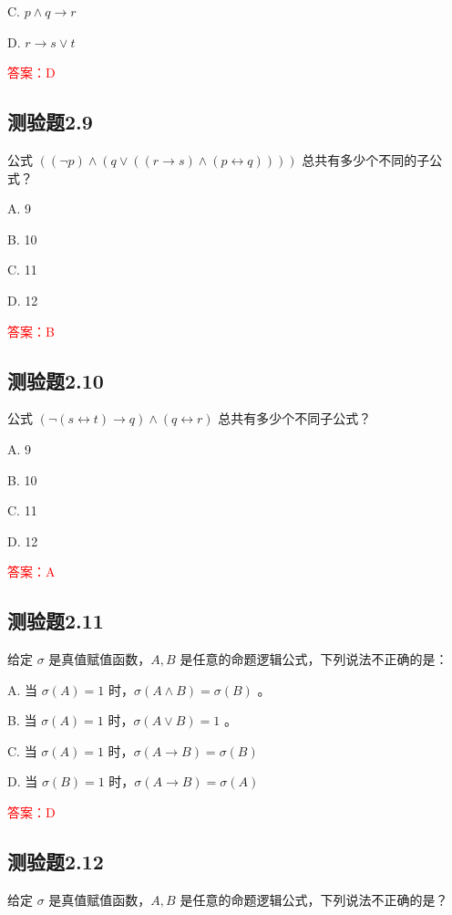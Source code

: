 \documentclass[UTF8, heading=true]{ctexart}
\begin{document}
C. $p \wedge q \rightarrow r$

D. $r \rightarrow s \vee t$

\textcolor{red}{答案：D}


\subsection{测验题2.9}

公式 $((\neg p) \wedge(q \vee((r \rightarrow s) \wedge(p \leftrightarrow q))))$ 总共有多少个不同的子公式？

A. 9

B. 10

C. 11

D. 12

\textcolor{red}{答案：B}

\subsection{测验题2.10}

公式 $(\neg(s \leftrightarrow t) \rightarrow q) \wedge(q \leftrightarrow r)$ 总共有多少个不同子公式？

A. 9

B. 10

C. 11

D. 12

\textcolor{red}{答案：A}

\subsection{测验题2.11}

给定 $\sigma$ 是真值赋值函数，$A, B$ 是任意的命题逻辑公式，下列说法不正确的是：

A. 当 $\sigma(A)=1$ 时，$\sigma(A \wedge B)=\sigma(B)$ 。

B. 当 $\sigma(A)=1$ 时，$\sigma(A \vee B)=1$ 。

C. 当 $\sigma(A)=1$ 时，$\sigma(A \rightarrow B)=\sigma(B)$

D. 当 $\sigma(B)=1$ 时，$\sigma(A \rightarrow B)=\sigma(A)$

\textcolor{red}{答案：D}

\subsection{测验题2.12}

给定 $\sigma$ 是真值赋值函数，$A, B$ 是任意的命题逻辑公式，下列说法不正确的是？
\end{document}
